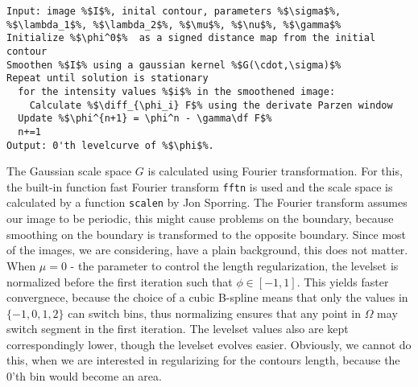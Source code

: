 \begin{lstlisting}
Input: image %$I$%, inital contour, parameters %$\sigma$%, %$\lambda_1$%, %$\lambda_2$%, %$\mu$%, %$\nu$%, %$\gamma$%
Initialize %$\phi^0$%  as a signed distance map from the initial contour
Smoothen %$I$% using a gaussian kernel %$G(\cdot,\sigma)$%
Repeat until solution is stationary
  for the intensity values %$i$% in the smoothened image:
    Calculate %$\diff_{\phi_i} F$% using the derivate Parzen window
  Update %$\phi^{n+1} = \phi^n - \gamma\df F$%
  n+=1
Output: 0'th levelcurve of %$\phi$%.
\end{lstlisting} 

The Gaussian scale space $G$ is calculated using Fourier transformation. For this, the built-in function fast Fourier transform \texttt{fftn} is used and the scale space is calculated by a function \texttt{scalen} by Jon Sporring. The Fourier transform assumes our image to be periodic, this might cause problems on the boundary, because smoothing on the boundary is transformed to the opposite boundary. Since most of the images, we are considering, have a plain background, this does not matter.\\
When $\mu=0$ - the parameter to control the length regularization, the levelset is normalized before the first iteration such that $\phi\in [-1,1]$. This yields faster convergnece, because the choice of a cubic B-spline means that only the values in $\{-1,0,1,2\}$ can switch bins, thus normalizing ensures that any point in $\Omega$ may switch segment in the first iteration. The levelset values also are kept correspondingly lower, though the levelset evolves easier. Obviously, we cannot do this, when we are interested in regularizing for the contours length, because the 0'th bin would become an area.\\
